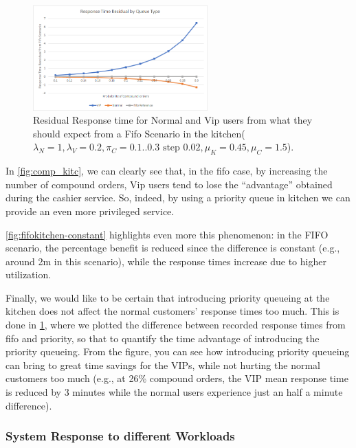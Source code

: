 \begin{figure}[h!]
  \centering
  \includegraphics[width=0.6\textwidth]{figs/responseTimeResidualKitchen.png}
  \caption{Residual Response time for Normal and Vip users from what they should expect from a Fifo Scenario in the kitchen($\lambda_N=1,\lambda_V=0.2,\pi_C={{0.1..0.3 \text{ step } 0.02}}, \mu_K=0.45, \mu_C=1.5$).}
  \label{fig:residual}
\end{figure}

In \cref{fig:comp_kitc}, we can clearly see that, in the fifo case, by increasing the number of compound orders, Vip users tend to lose the ``advantage'' obtained during the cashier service. So, indeed, by using a priority queue in kitchen we can provide an even more privileged service. 

\cref{fig:fifokitchen-constant} highlights even more this phenomenon: in the FIFO scenario, the percentage benefit is reduced since the difference is constant (e.g., around 2m in this scenario), while the response times increase due to higher utilization.

Finally, we would like to be certain that introducing priority queueing at the kitchen does not affect the normal customers' response times too much. This is done in \cref{fig:residual}, where we plotted the difference between recorded response times from fifo and priority, so that to quantify the time advantage of introducing the priority queueing. From the figure, you can see how introducing priority queueing can bring to great time savings for the VIPs, while not hurting the normal customers too much (e.g., at 26\% compound orders, the VIP mean response time is reduced by 3 minutes while the normal users experience just an half a minute difference). 

\subsubsection{System Response to different Workloads}


